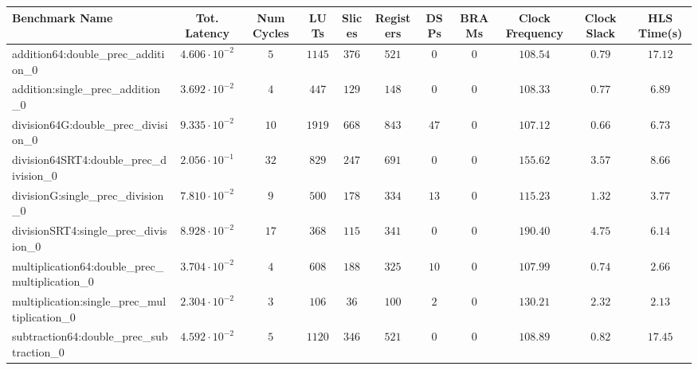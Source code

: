 \begin{tabular}{|l|c|c|c|c|c|c|c|c|c|c|}
\hline
Benchmark Name                                   & Tot. Latency            & Num Cycles & LUTs     & Slices   & Registers & DSPs   & BRAMs & Clock Frequency & Clock Slack & HLS Time(s) \\
\hline
addition64:double\_prec\_addition\_0             & $ 4.606 \cdot 10^{-2} $ & $ 5      $ & $ 1145 $ & $ 376  $ & $ 521   $ & $ 0  $ & $ 0 $ & $ 108.54      $ & $ 0.79    $ & $ 17.12   $ \\
addition:single\_prec\_addition\_0               & $ 3.692 \cdot 10^{-2} $ & $ 4      $ & $ 447  $ & $ 129  $ & $ 148   $ & $ 0  $ & $ 0 $ & $ 108.33      $ & $ 0.77    $ & $ 6.89    $ \\
division64G:double\_prec\_division\_0            & $ 9.335 \cdot 10^{-2} $ & $ 10     $ & $ 1919 $ & $ 668  $ & $ 843   $ & $ 47 $ & $ 0 $ & $ 107.12      $ & $ 0.66    $ & $ 6.73    $ \\
division64SRT4:double\_prec\_division\_0         & $ 2.056 \cdot 10^{-1} $ & $ 32     $ & $ 829  $ & $ 247  $ & $ 691   $ & $ 0  $ & $ 0 $ & $ 155.62      $ & $ 3.57    $ & $ 8.66    $ \\
divisionG:single\_prec\_division\_0              & $ 7.810 \cdot 10^{-2} $ & $ 9      $ & $ 500  $ & $ 178  $ & $ 334   $ & $ 13 $ & $ 0 $ & $ 115.23      $ & $ 1.32    $ & $ 3.77    $ \\
divisionSRT4:single\_prec\_division\_0           & $ 8.928 \cdot 10^{-2} $ & $ 17     $ & $ 368  $ & $ 115  $ & $ 341   $ & $ 0  $ & $ 0 $ & $ 190.40      $ & $ 4.75    $ & $ 6.14    $ \\
multiplication64:double\_prec\_multiplication\_0 & $ 3.704 \cdot 10^{-2} $ & $ 4      $ & $ 608  $ & $ 188  $ & $ 325   $ & $ 10 $ & $ 0 $ & $ 107.99      $ & $ 0.74    $ & $ 2.66    $ \\
multiplication:single\_prec\_multiplication\_0   & $ 2.304 \cdot 10^{-2} $ & $ 3      $ & $ 106  $ & $ 36   $ & $ 100   $ & $ 2  $ & $ 0 $ & $ 130.21      $ & $ 2.32    $ & $ 2.13    $ \\
subtraction64:double\_prec\_subtraction\_0       & $ 4.592 \cdot 10^{-2} $ & $ 5      $ & $ 1120 $ & $ 346  $ & $ 521   $ & $ 0  $ & $ 0 $ & $ 108.89      $ & $ 0.82    $ & $ 17.45   $ \\

\end{tabular}
